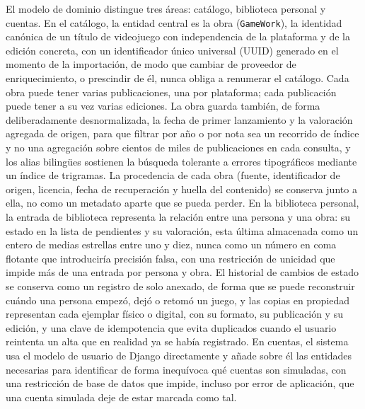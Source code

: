 El modelo de dominio distingue tres áreas: catálogo, biblioteca personal y cuentas. En el
catálogo, la entidad central es la obra (\texttt{GameWork}), la identidad canónica de un
título de videojuego con independencia de la plataforma y de la edición concreta, con un
identificador único universal (UUID) generado en el momento de la importación, de modo que
cambiar de proveedor de enriquecimiento, o prescindir de él, nunca obliga a renumerar el
catálogo. Cada obra puede tener varias publicaciones, una por plataforma; cada publicación
puede tener a su vez varias ediciones. La obra guarda también, de forma deliberadamente
desnormalizada, la fecha de primer lanzamiento y la valoración agregada de origen, para que
filtrar por año o por nota sea un recorrido de índice y no una agregación sobre cientos de
miles de publicaciones en cada consulta, y los alias bilingües sostienen la búsqueda tolerante
a errores tipográficos mediante un índice de trigramas. La procedencia de cada obra (fuente,
identificador de origen, licencia, fecha de recuperación y huella del contenido) se conserva
junto a ella, no como un metadato aparte que se pueda perder. En la biblioteca personal, la
entrada de biblioteca representa la relación entre una persona y una obra: su estado en la
lista de pendientes y su valoración, esta última almacenada como un entero de medias estrellas
entre uno y diez, nunca como un número en coma flotante que introduciría precisión falsa, con
una restricción de unicidad que impide más de una entrada por persona y obra. El historial de
cambios de estado se conserva como un registro de solo anexado, de forma que se puede
reconstruir cuándo una persona empezó, dejó o retomó un juego, y las copias en propiedad
representan cada ejemplar físico o digital, con su formato, su publicación y su edición, y una
clave de idempotencia que evita duplicados cuando el usuario reintenta un alta que en realidad
ya se había registrado. En cuentas, el sistema usa el modelo de usuario de Django directamente
y añade sobre él las entidades necesarias para identificar de forma inequívoca qué cuentas son
simuladas, con una restricción de base de datos que impide, incluso por error de aplicación,
que una cuenta simulada deje de estar marcada como tal.


